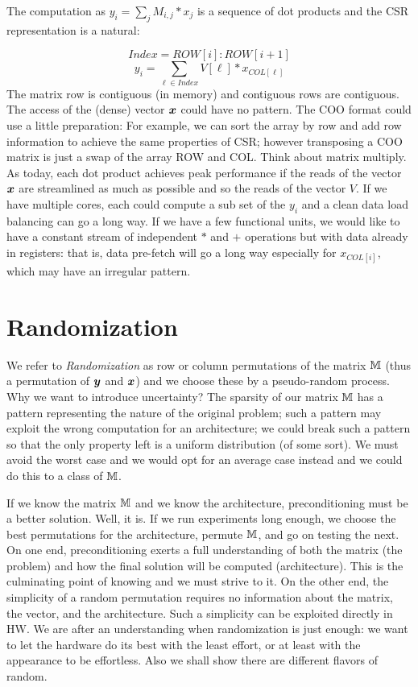 \documentclass[manuscript,screen]{acmart}
\begin{document}
The computation as $y_i = \sum_j M_{i,j}*x_j$ is a sequence of dot
products and the CSR representation is a natural:

\[ Index = ROW[i]:ROW[i+1] \]
\[
y_i =  \sum_{\ell\in Index} V[\ell] * x_{COL[\ell]}  
\]
The matrix row is contiguous (in memory) and contiguous rows are
contiguous. The access of the (dense) vector ${\boldsymbol x}$ could have no
pattern. The COO format could use a little preparation: For example,
we can sort the array by row and add row information to achieve the
same properties of CSR; however transposing a COO matrix is just a
swap of the array ROW and COL. Think about matrix multiply. As today,
each dot product achieves peak performance if the reads of the vector
${\boldsymbol x}$ are streamlined as much as possible and so the reads of the
vector $V$. If we have multiple cores, each could compute a sub set of
the $y_i$ and a clean data load balancing can go a long way. If we
have a few functional units, we would like to have a constant stream
of independent $*$ and $+$ operations but with data already in
registers: that is, data pre-fetch will go a long way especially for
$x_{COL[i]}$, which may have an irregular pattern.


\section{Randomization}
\label{sec:randomization}
We refer to {\em Randomization} as row or column permutations of the
matrix $\mathbb{M}$ (thus a permutation of ${\boldsymbol y}$ and ${\boldsymbol x}$) and we choose
these by a pseudo-random process. Why we want to introduce
uncertainty? The sparsity of our matrix $\mathbb{M}$ has a pattern
representing the nature of the original problem; such a pattern may
exploit the wrong computation for an architecture; we could break such
a pattern so that the only property left is a uniform distribution (of
some sort). We must avoid the worst case and we would opt for an
average case instead and we could do this to a class of $\mathbb{M}$. 

If we know the matrix $\mathbb{M}$ and we know the architecture,
preconditioning must be a better solution.  Well, it is. If we run
experiments long enough, we choose the best permutations for the
architecture, permute $\mathbb{M}$, and go on testing the next.  On one end,
preconditioning exerts a full understanding of both the matrix (the
problem) and how the final solution will be computed
(architecture). This is the culminating point of knowing and we must
strive to it. On the other end, the simplicity of a random permutation
requires no information about the matrix, the vector, and the
architecture. Such a simplicity can be exploited directly in HW. We
are after an understanding when randomization is just enough: we want
to let the hardware do its best with the least effort, or at least
with the appearance to be effortless. Also we shall show there are
different flavors of random.
\end{document}
